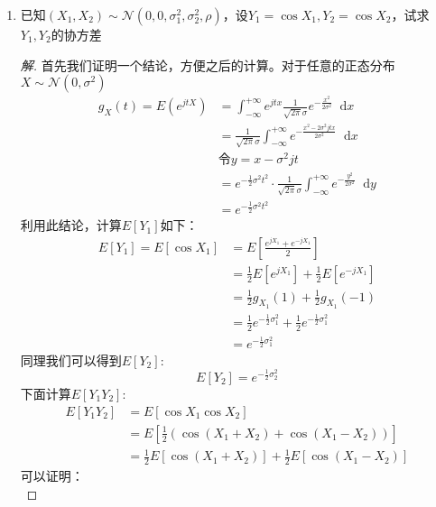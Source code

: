 \documentclass[12pt]{article}
\newcommand{\hei}{\CJKfamily{hei}}                          %
\newcommand*{\dif}{\mathop{}\!\mathrm{d}}
\begin{document}
\begin{enumerate}
\item {\hei 已知$(X_1,X_2)\sim \mathcal{N}(0,0,\sigma_1^2,\sigma_2^2,\rho)$，设$Y_1=\cos X_1,Y_2=\cos X_2$，试求$Y_1,Y_2$的协方差}
\begin{proof}[解]
	首先我们证明一个结论，方便之后的计算。对于任意的正态分布$X\sim\mathcal{N}(0,\sigma^2)$
	\begin{equation}
	\begin{aligned}
		g_X(t)=E(e^{jtX})&=\int_{-\infty}^{+\infty}e^{jtx}\frac{1}{\sqrt{2\pi}\sigma}e^{-\frac{x^2}{2\sigma^2}}\dif x \\
		&=\frac{1}{\sqrt{2\pi}\sigma}\int_{-\infty}^{+\infty}e^{-\frac{x^2-2\sigma^2jtx}{2\sigma^2}}\dif x \\
		&\mbox{令}y=x-\sigma^2jt \\
		&=e^{-\frac{1}{2}\sigma^2t^2}\cdot\frac{1}{\sqrt{2\pi}\sigma}\int_{-\infty}^{+\infty}e^{-\frac{y^2}{2\sigma^2}}\dif y \\
		&=e^{-\frac{1}{2}\sigma^2t^2}
	\end{aligned}
	\end{equation}
	利用此结论，计算$E[Y_1]$如下：
	\begin{equation}
	\label{eq1}
	\begin{aligned}
	E[Y_1]=E[\cos X_1]&=E\left[\frac{e^{jX_1}+e^{-jX_1}}{2}\right] \\
	&=\frac{1}{2}E\left[e^{jX_1}\right]+\frac{1}{2}E\left[e^{-jX_1}\right] \\
	&=\frac{1}{2}g_{X_1}(1)+\frac{1}{2}g_{X_1}(-1) \\
	&=\frac{1}{2}e^{-\frac{1}{2}\sigma_1^2}+\frac{1}{2}e^{-\frac{1}{2}\sigma_1^2} \\
	&=e^{-\frac{1}{2}\sigma_1^2}
	\end{aligned}
	\end{equation}
	同理我们可以得到$E[Y_2]$:
	\begin{equation}
	E[Y_2]=e^{-\frac{1}{2}\sigma_2^2}
	\end{equation}
	下面计算$E[Y_1Y_2]$:
	\begin{equation}
	\label{eq2}
	\begin{aligned}
	E[Y_1Y_2]&=E[\cos X_1\cos X_2] \\
	&=E\left[\frac{1}{2}\left(\cos(X_1+X_2)+\cos(X_1-X_2)\right)\right] \\
	&=\frac{1}{2}E\left[\cos(X_1+X_2)\right]+\frac{1}{2}E\left[\cos(X_1-X_2)\right]
	\end{aligned}
	\end{equation}
	可以证明：
	\begin{equation}

\end{equation}
\end{proof}
\end{enumerate}
\end{document}
